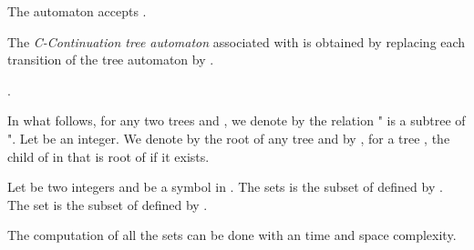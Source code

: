 \documentclass{llncs}
\begin{document}
\begin{corollary}
The automaton  accepts .
\end{corollary}

The  \emph{C-Continuation tree automaton}  associated with  is obtained by replacing each transition   of the tree automaton  by .

\begin{corollary}
.  
\end{corollary}

In what follows, for any two trees  and , we denote by  the relation " is a subtree of ". Let  be an integer. We denote by  the root of any tree  and by , for a tree , the  child of  in  that is root of  if it exists. 



Let
   be two integers and  be a symbol in . The sets  is the subset of  defined by . The set  is the subset of  defined by .
  
\begin{proposition}\label{prop tps lin pour follow}
The computation of all the sets  can be done with an  time and space complexity. 
\end{proposition}
\end{document}
